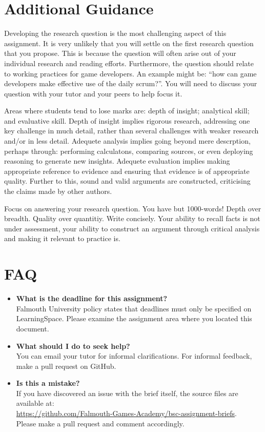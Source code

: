 \documentclass{../fal_assignment}
\begin{document}
\section*{Additional Guidance}

Developing the research question is the most challenging aspect of this assignment. It is very unlikely that you will settle on the first research question that you propose. This is because the question will often arise out of your individual research and reading efforts. Furthermore, the question should relate to working practices for game developers. An example might be: ``how can game developers make effective use of the daily scrum?''. You will need to discuss your question with your tutor and your peers to help focus it.

Areas where students tend to lose marks are: depth of insight; analytical skill; and evaluative skill. Depth of insight implies rigorous research, addressing one key challenge in much detail, rather than several challenges with weaker research and/or in less detail. Adequete analysis implies going beyond mere descrption, perhaps through: performing calculatons, comparing sources, or even deploying reasoning to generate new insights. Adequete evaluation implies making appropriate reference to evidence and ensuring that evidence is of appropriate quality. Further to this, sound and valid arguments are constructed, criticising the claims made by other authors.

Focus on answering your research question. You have but 1000-words! Depth over breadth. Quality over quantitiy. Write concisely. Your ability to recall facts is not under assessment, your ability to construct an argument through critical analysis and making it relevant to practice is.

\section*{FAQ}

\begin{itemize}
	\item 	\textbf{What is the deadline for this assignment?} \\ 
    		Falmouth University policy states that deadlines must only be specified on LearningSpace. Please examine the assignment area where you located this document.
    		
	\item 	\textbf{What should I do to seek help?} \\ 
    		You can email your tutor for informal clarifications. For informal feedback, make a pull request on GitHub. 
    		
    	\item 	\textbf{Is this a mistake?} \\ 	
    		If you have discovered an issue with the brief itself, the source files are available at: \\
    		\url{https://github.com/Falmouth-Games-Academy/bsc-assignment-briefs}.\\
    		 Please make a pull request and comment accordingly.
\end{itemize}
\end{document}
